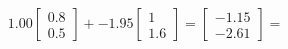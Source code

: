\documentclass[preview]{standalone}
\begin{document}
\begin{align*}
1.00 \begin{bmatrix} 0.8 \\ 0.5 \end{bmatrix} + -1.95 \begin{bmatrix} 1 \\ 1.6 \end{bmatrix} = \begin{bmatrix} -1.15 \\ -2.61 \end{bmatrix} =
\end{align*}
\end{document}
